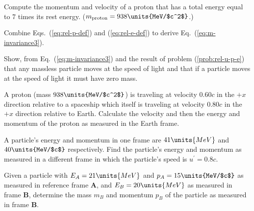 \begin{problem}
Compute the momentum and velocity of a proton that has a total
energy equal to 7 times its rest energy.  ($m_{\rm proton} =
938\units{MeV/$c^2$}$.)
\label{prob:proton}
\end{problem}

\begin{problem}
Combine Eqs.~(\ref{eq:rel-p-def}) and (\ref{eq:rel-e-def}) to derive 
Eq.~(\ref{eq:m-invariance3}).
\end{problem}

\begin{problem}
Show, from Eq.~(\ref{eq:m-invariance3}) and the result of
problem (\ref{prob:rel-u-p-e}) that any massless particle moves at
the speed of light and that if a particle moves at the speed of light
it must have zero mass.    
\end{problem}

\begin{problem}
A proton (mass $938\units{MeV/$c^2$}$) is traveling at velocity
$0.60c$ in the $+x$ direction relative to a spaceship which itself is
traveling at velocity $0.80c$ in the $+x$ direction relative to Earth.
Calculate the velocity and then the energy and momentum of the proton
as measured in the Earth frame.
\end{problem}

\begin{problem}
A particle's energy and momentum in one frame are $41\units{MeV}$ and 
$40\units{MeV/$c$}$ respectively.  Find the particle's energy and 
momentum as measured in a different frame in which the particle's speed is 
$u^\prime = 0.8c$.
\label{prob:ep_transform}    
\end{problem}

\begin{problem}
Given a particle with $E_A = 21\units{MeV}$ and $p_A
= 15\units{MeV/$c$}$ as measured in reference frame {\bf A}, and 
$E_B = 20\units{MeV}$ as measured in frame {\bf B}, determine the 
mass $m_B$ and momentum $p_B$ of the particle as measured in 
frame {\bf B}.  
\end{problem}

